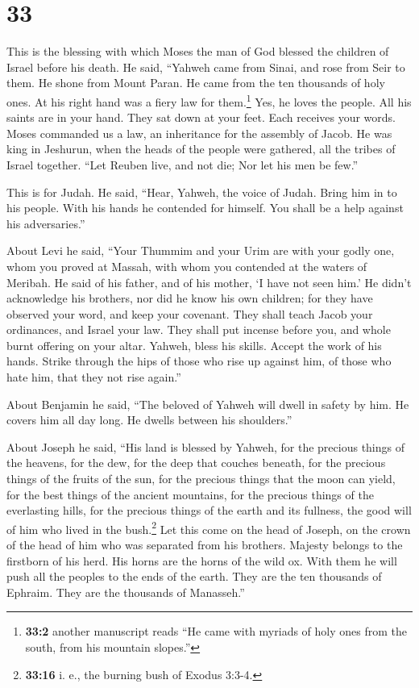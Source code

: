 \hypertarget{section-32}{%
\section{33}\label{section-32}}

 This is the blessing with which Moses the man of God
blessed the children of Israel before his death.  He said,
``Yahweh came from Sinai, and rose from Seir to them. He shone from
Mount Paran. He came from the ten thousands of holy ones. At his right
hand was a fiery law for them.\footnote{\textbf{33:2} another manuscript
  reads ``He came with myriads of holy ones from the south, from his
  mountain slopes.''}  Yes, he loves the people. All his
saints are in your hand. They sat down at your feet. Each receives your
words.  Moses commanded us a law, an inheritance for the
assembly of Jacob.  He was king in Jeshurun, when the
heads of the people were gathered, all the tribes of Israel together.
 ``Let Reuben live, and not die; Nor let his men be few.''

 This is for Judah. He said, ``Hear, Yahweh, the voice of
Judah. Bring him in to his people. With his hands he contended for
himself. You shall be a help against his adversaries.''

 About Levi he said, ``Your Thummim and your Urim are with
your godly one, whom you proved at Massah, with whom you contended at
the waters of Meribah.  He said of his father, and of his
mother, `I have not seen him.' He didn't acknowledge his brothers, nor
did he know his own children; for they have observed your word, and keep
your covenant.  They shall teach Jacob your ordinances,
and Israel your law. They shall put incense before you, and whole burnt
offering on your altar.  Yahweh, bless his skills. Accept
the work of his hands. Strike through the hips of those who rise up
against him, of those who hate him, that they not rise again.''

 About Benjamin he said, ``The beloved of Yahweh will
dwell in safety by him. He covers him all day long. He dwells between
his shoulders.''

 About Joseph he said, ``His land is blessed by Yahweh,
for the precious things of the heavens, for the dew, for the deep that
couches beneath,  for the precious things of the fruits
of the sun, for the precious things that the moon can yield,
 for the best things of the ancient mountains, for the
precious things of the everlasting hills,  for the
precious things of the earth and its fullness, the good will of him who
lived in the bush.\footnote{\textbf{33:16} i. e., the burning bush of
  Exodus 3:3-4.} Let this come on the head of Joseph, on the crown of
the head of him who was separated from his brothers. 
Majesty belongs to the firstborn of his herd. His horns are the horns of
the wild ox. With them he will push all the peoples to the ends of the
earth. They are the ten thousands of Ephraim. They are the thousands of
Manasseh.''

